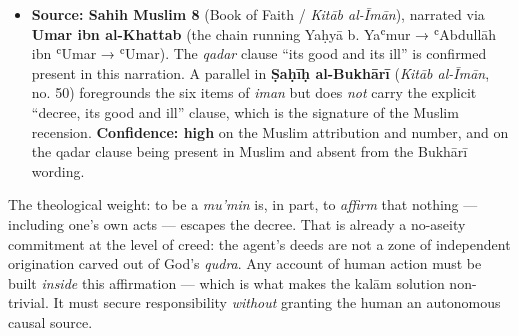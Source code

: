 \documentclass[11pt]{article}
\begin{document}
\begin{itemize}
\item \textbf{Source: Sahih Muslim 8} (Book of Faith /\allowbreak{} \emph{Kitāb al-Īmān}), narrated via \textbf{Umar ibn al-Khattab} (the chain running Yaḥyā b. Yaʿmur → ʿAbdullāh ibn ʿUmar → ʿUmar). The \emph{qadar} clause ``its good and its ill'' is confirmed present in this narration. A parallel in \textbf{Ṣaḥīḥ al-Bukhārī} (\emph{Kitāb al-Īmān}, no. 50) foregrounds the six items of \emph{iman} but does \emph{not} carry the explicit ``decree, its good and ill'' clause, which is the signature of the Muslim recension. \textbf{Confidence: high} on the Muslim attribution and number, and on the qadar clause being present in Muslim and absent from the Bukhārī wording.
\end{itemize}

The theological weight: to be a \emph{mu'min} is, in part, to \emph{affirm} that nothing — including one's own acts — escapes the decree. That is already a no-aseity commitment at the level of creed: the agent's deeds are not a zone of independent origination carved out of God's \emph{qudra}. Any account of human action must be built \emph{inside} this affirmation — which is what makes the kalām solution non-trivial. It must secure responsibility \emph{without} granting the human an autonomous causal source.
\end{document}
